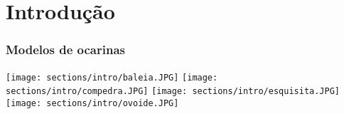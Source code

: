 \section{Introdução}


\begin{frame}
\frametitle{Modelos de ocarinas}
\texttt{[image: sections/intro/baleia.JPG]}
\texttt{[image: sections/intro/compedra.JPG]}
\texttt{[image: sections/intro/esquisita.JPG]}
\texttt{[image: sections/intro/ovoide.JPG]}
\end{frame}

